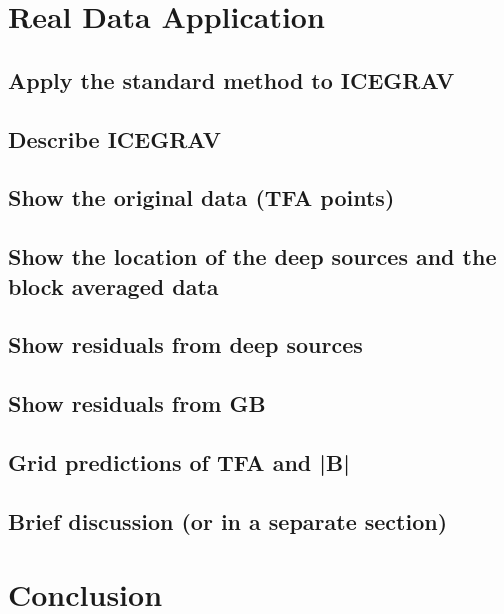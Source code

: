 \section{Real Data Application}

\subsection{Apply the standard method to ICEGRAV}

\subsection{Describe ICEGRAV}

\subsection{Show the original data (TFA points)}

\subsection{Show the location of the deep sources and the block averaged data}

\subsection{Show residuals from deep sources}

\subsection{Show residuals from GB}

\subsection{Grid predictions of TFA and |B|}

\subsection{Brief discussion (or in a separate section)}



\section{Conclusion}

